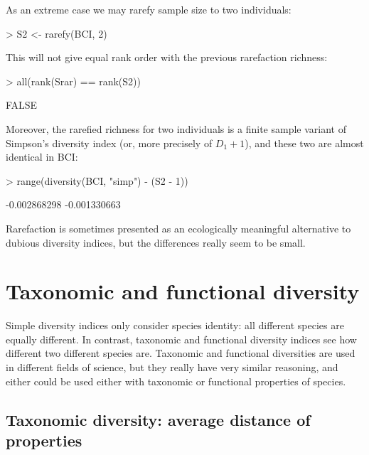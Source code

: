 \documentclass[a4paper,10pt]{amsart}
\begin{document}
As an extreme case we may rarefy sample size to two individuals:
\begin{Schunk}
\begin{Sinput}
> S2 <- rarefy(BCI, 2)
\end{Sinput}
\end{Schunk}
This will not give equal rank order with the previous rarefaction
richness:
\begin{Schunk}
\begin{Sinput}
> all(rank(Srar) == rank(S2))
\end{Sinput}
\begin{Soutput}
[1] FALSE
\end{Soutput}
\end{Schunk}
Moreover, the rarefied richness for two individuals is a finite
sample variant of Simpson's diversity index (or, more precisely of
$D_1 + 1$), and these two are almost identical in BCI:
\begin{Schunk}
\begin{Sinput}
> range(diversity(BCI, "simp") - (S2 - 1))
\end{Sinput}
\begin{Soutput}
[1] -0.002868298 -0.001330663
\end{Soutput}
\end{Schunk}
Rarefaction is sometimes presented as an ecologically meaningful
alternative to dubious diversity indices, but the differences really
seem to be small.

\section{Taxonomic and functional diversity}

Simple diversity indices only consider species identity: all different
species are equally different. In contrast, taxonomic and functional
diversity indices see how different two different species
are. Taxonomic and functional diversities are used in different fields
of science, but they really have very similar reasoning, and either
could be used either with taxonomic or functional properties of
species.

\subsection{Taxonomic diversity: average distance of properties}
\end{document}
